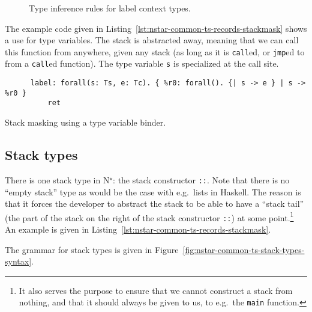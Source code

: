 \begin{figure}[htb]
  \centering

  \begin{prooftree}
  \end{prooftree}

  \caption{Type inference rules for label context types.}
  \label{fig:nstar-common-ts-label-types-typerules}
\end{figure}

The example code given in Listing~\ref{lst:nstar-common-ts-records-stackmask} shows a use for type variables.
The stack is abstracted away, meaning that we can call this function from anywhere, given any stack (as long as it is \texttt{call}ed, or \texttt{jmp}ed to from a \texttt{call}ed function).
The type variable \texttt{s} is specialized at the call site.

\begin{listing}[htb]
  \centering
  \begin{minipage}{0.90\textwidth}
    \begin{verbatim}
      label: forall(s: Ts, e: Tc). { %r0: forall(). {| s -> e } | s -> %r0 }
          ret
    \end{verbatim}
  \end{minipage}
  \caption{Stack masking using a type variable binder.}
  \label{lst:nstar-common-ts-records-stackmask}
\end{listing}

\subsection{Stack types}\label{subsec:nstar-common-ts-stack}

There is one stack type in N$^\star$: the stack constructor \texttt{::}.
Note that there is no ``empty stack'' type as would be the case with e.g.\ lists in Haskell.
The reason is that it forces the developer to abstract the stack to be able to have a ``stack tail'' (the part of the stack on the right of the stack constructor \texttt{::}) at some point.\footnote{It also serves the purpose to ensure that we cannot construct a stack from nothing, and that it should always be given to us, to e.g.\ the \texttt{main} function.}
An example is given in Listing~\ref{lst:nstar-common-ts-records-stackmask}.

The grammar for stack types is given in Figure~\ref{fig:nstar-common-ts-stack-types-syntax}.

